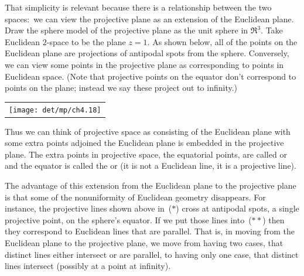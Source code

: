 That simplicity is relevant because there is a 
relationship between the two spaces:~we can view the 
projective plane as an extension of the Euclidean plane.
Draw the sphere model of the projective plane as the unit sphere in $\Re^3$.
Take Euclidean $2$-space to be the plane $z=1$.
As shown below, all of the points on the Euclidean plane are projections of  
antipodal spots from the sphere.
Conversely, we can view some points
in the projective plane as corresponding to points in Euclidean space.
(Note that projective points on the equator don't correspond to points on
the plane; instead we say these project out to infinity.)
\begin{center}
 \hfill
  \begin{tabular}{@{}c@{}}\texttt{[image: det/mp/ch4.18]}\end{tabular}
 \hfill\llap{($**$)}
\end{center}
Thus we can think of projective space as consisting of the Euclidean plane 
with some extra points adjoined \Dash  
the Euclidean plane is embedded in the projective plane.
The extra points in projective space, the equatorial points,
are called %
or 
and the equator is called the 
%
 or 
(it is not a Euclidean line, it is a projective line). 

The advantage of this extension from the Euclidean plane 
to the projective plane
is that some of the nonuniformity 
of Euclidean geometry disappears.
For instance, the projective lines shown above in~($*$) cross
at antipodal spots, a single projective point, on the sphere's equator.
If we put those lines into~($**$) then they correspond to Euclidean lines that
are parallel.
That is, in moving from the Euclidean plane to the projective plane, we move
from having two cases, 
that distinct lines either intersect or are parallel, to having only
one case, that distinct lines intersect (possibly at a point at infinity). 

